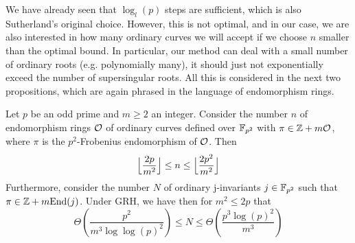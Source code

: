 We have already seen that $\log_l(p)$ steps are sufficient, which is also Sutherland's original choice.
However, this is not optimal, and in our case, we are also interested in how many ordinary curves we will accept if we choose $n$ smaller than the optimal bound.
In particular, our method can deal with a small number of ordinary roots (e.g. polynomially many), it should just not exponentially exceed the number of supersingular roots.
All this is considered in the next two propositions, which are again phrased in the language of endomorphism rings.
\begin{prop}
    \label{prop:frobenius_in_nonmaximal_order}
    Let $p$ be an odd prime and $m \geq 2$ an integer.
    Consider the number $n$ of endomorphism rings $\mathcal{O}$ of ordinary curves defined over $\mathbb{F}_{p^2}$ with $\pi \in \mathbb{Z} + m\mathcal{O}$, where $\pi$ is the $p^2$-Frobenius endomorphism of $\mathcal{O}$.
    Then
    \begin{equation*}
        \Bigl\lfloor \frac {2p} {m^2} \Bigr\rfloor \leq n \leq \Bigl\lfloor \frac {2p^2} {m^2} \Bigr\rfloor
    \end{equation*}
    Furthermore, consider the number $N$ of ordinary j-invariants $j \in \mathbb{F}_{p^2}$ such that $\pi \in \mathbb{Z} + m\mathrm{End}(j)$.
    Under GRH, we have then for $m^2 \leq 2p$ that
    \begin{equation*}
        \Theta\left( \frac {p^2} {m^3 \log\log(p)^2} \right) \leq N \leq \Theta\left( \frac {p^3\log(p)^2} {m^3} \right)
    \end{equation*}
\end{prop}
